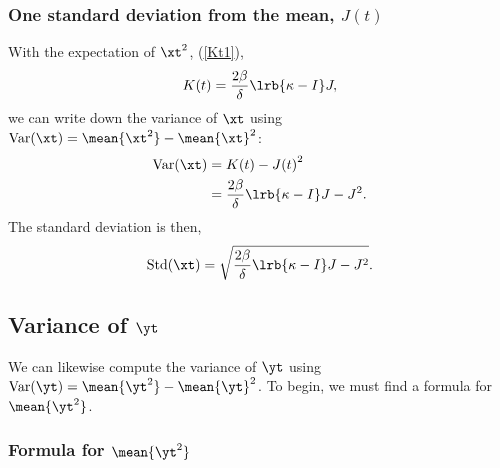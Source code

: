 \subsubsection{One standard deviation from the mean, $J(t)$}
With the expectation of $\xt^2$, (\ref{Kt1}), 
\begin{equation*}
K(t) = \frac{2\beta}{\delta}\lrb{\kappa- I}J,
\end{equation*}
we can write down the variance of $\xt$ using $\text{Var}(\xt) = \mean{\xt^2} - \mean{\xt}^2$:
\begin{align*}
\text{Var}(\xt) &= K(t) - {J(t)}^2\\
&= \frac{2\beta}{\delta}\lrb{\kappa - I}J - J^2.
\end{align*}
The standard deviation is then,
\begin{equation*}
\text{Std}(\xt) = \sqrt{\frac{2\beta}{\delta}\lrb{\kappa- I}J - J^2}.
\end{equation*}



\subsection{Variance of $\yt$}

We can likewise compute the variance of $\yt$ using $\text{Var}(\yt) = \mean{\yt^2} - \mean{\yt}^2$. To begin, we must find a formula for $\mean{\yt^2}$.


\subsubsection{Formula for $\mean{\yt^2}$}


